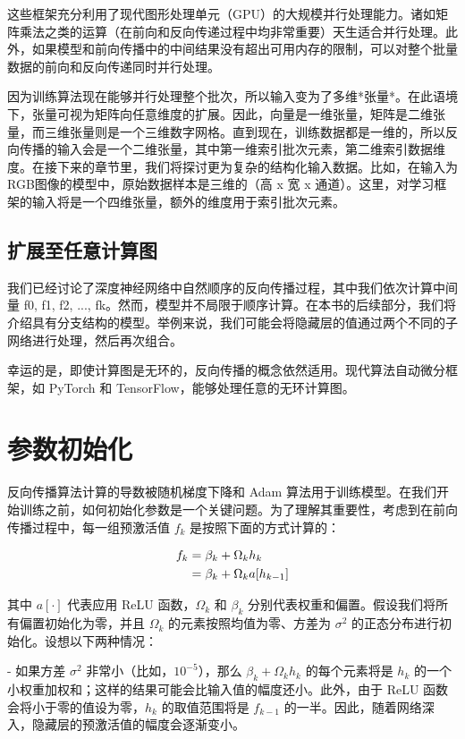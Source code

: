 这些框架充分利用了现代图形处理单元（GPU）的大规模并行处理能力。诸如矩阵乘法之类的运算（在前向和反向传递过程中均非常重要）天生适合并行处理。此外，如果模型和前向传播中的中间结果没有超出可用内存的限制，可以对整个批量数据的前向和反向传递同时并行处理。

因为训练算法现在能够并行处理整个批次，所以输入变为了多维*张量*。在此语境下，张量可视为矩阵向任意维度的扩展。因此，向量是一维张量，矩阵是二维张量，而三维张量则是一个三维数字网格。直到现在，训练数据都是一维的，所以反向传播的输入会是一个二维张量，其中第一维索引批次元素，第二维索引数据维度。在接下来的章节里，我们将探讨更为复杂的结构化输入数据。比如，在输入为RGB图像的模型中，原始数据样本是三维的（高 x 宽 x 通道）。这里，对学习框架的输入将是一个四维张量，额外的维度用于索引批次元素。
\subsection{扩展至任意计算图}
我们已经讨论了深度神经网络中自然顺序的反向传播过程，其中我们依次计算中间量 f0, f1, f2, ..., fk。然而，模型并不局限于顺序计算。在本书的后续部分，我们将介绍具有分支结构的模型。举例来说，我们可能会将隐藏层的值通过两个不同的子网络进行处理，然后再次组合。

幸运的是，即使计算图是无环的，反向传播的概念依然适用。现代算法自动微分框架，如 PyTorch 和 TensorFlow，能够处理任意的无环计算图。
\section{参数初始化 }
反向传播算法计算的导数被随机梯度下降和 Adam 算法用于训练模型。在我们开始训练之前，如何初始化参数是一个关键问题。为了理解其重要性，考虑到在前向传播过程中，每一组预激活值 \(f_k\) 是按照下面的方式计算的：


\begin{align}
f_k &= \beta_k + \Omega_k h_k \notag \\
&= \beta_k + \Omega_k a[h_{k-1}] 
\end{align}


其中 \(a[\cdot]\) 代表应用 ReLU 函数，\(\Omega_k\) 和 \(\beta_k\) 分别代表权重和偏置。假设我们将所有偏置初始化为零，并且 \(\Omega_k\) 的元素按照均值为零、方差为 \(\sigma^2\) 的正态分布进行初始化。设想以下两种情况：

- 如果方差 \(\sigma^2\) 非常小（比如，\(10^{-5}\)），那么 \(\beta_k + \Omega_k h_k\) 的每个元素将是 \(h_k\) 的一个小权重加权和；这样的结果可能会比输入值的幅度还小。此外，由于 ReLU 函数会将小于零的值设为零，\(h_k\) 的取值范围将是 \(f_{k-1}\) 的一半。因此，随着网络深入，隐藏层的预激活值的幅度会逐渐变小。

